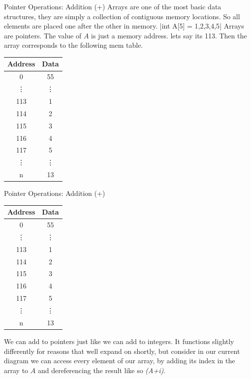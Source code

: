 \documentclass{beamer}
\begin{document}
\begin{frame}[fragile]{Pointer Operations: Addition (+)}
Arrays are one of the most basic data structures, they are simply a collection of contiguous memory locations. So all elements are placed one after the other in memory.
|int A[5] = {1,2,3,4,5}|
Arrays are pointers. The value of $A$ is just a memory address. lets say its 113. Then the array corresponds to the following mem table.
\begin{tabular}{|c|c|}
		\hline
		Address & Data\\
		\hline
		0 & 55 \\
		\hline
		\vdots & \vdots \\
		\hline
		113 & 1\\
		\hline
		114 & 2 \\
		\hline
		115 & 3 \\
		\hline
		116 & 4 \\
		\hline
		117 & 5 \\
		\hline
		\vdots & \vdots \\
		n & 13\\
		\hline
	\end{tabular}

\end{frame}

\begin{frame}[fragile]{Pointer Operations: Addition (+)}
\begin{tabular}{|c|c|}
		\hline
		Address & Data\\
		\hline
		0 & 55 \\
		\hline
		\vdots & \vdots \\
		\hline
		113 & 1\\
		\hline
		114 & 2 \\
		\hline
		115 & 3 \\
		\hline
		116 & 4 \\
		\hline
		117 & 5 \\
		\hline
		\vdots & \vdots \\
		n & 13\\
		\hline
	\end{tabular}

	We can add to pointers just like we can add to integers. It functions slightly differently for reasons that well expand on shortly, but consider in our current diagram we can access every element of our array, by adding its index in the array to $A$ and dereferencing the result like so {\it *(A+i)}.
\end{frame}
\end{document}

